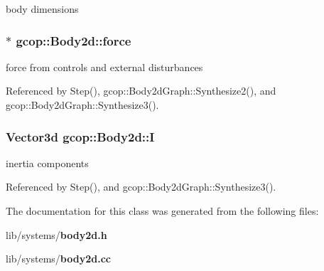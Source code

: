 body dimensions 

\subsubsection[{force}]{$\ast$ {\bf gcop\-::\-Body2d\-::force}}\label{classgcop_1_1Body2d_a15d6a732852ac2b3f0a0f7509f1c2b54}


force from controls and external disturbances 



\-Referenced by \-Step(), gcop\-::\-Body2d\-Graph\-::\-Synthesize2(), and gcop\-::\-Body2d\-Graph\-::\-Synthesize3().

\subsubsection[{\-I}]{\setlength{\rightskip}{0pt plus 5cm}\-Vector3d {\bf gcop\-::\-Body2d\-::\-I}}\label{classgcop_1_1Body2d_aaa88a3b7f22a545173bfc198c0776994}


inertia components 



\-Referenced by \-Step(), and gcop\-::\-Body2d\-Graph\-::\-Synthesize3().



\-The documentation for this class was generated from the following files\-:\begin{DoxyCompactItemize}
\item 
lib/systems/{\bf body2d.\-h}\item 
lib/systems/{\bf body2d.\-cc}\end{DoxyCompactItemize}
